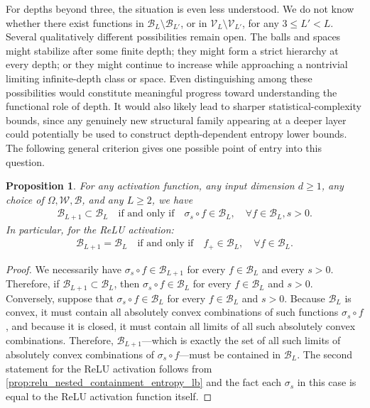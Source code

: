 \documentclass{article}
\def\cB{{\mathcal{B}}}
\def\cV{{\mathcal{V}}}
\def\cW{{\mathcal{W}}}
\newtheorem{proposition}[theorem]{Proposition}
\begin{document}
For depths beyond three, the situation is even less understood. We do not know whether there exist functions in $\cB_L\setminus \cB_{L'}$, or in $\cV_L\setminus \cV_{L'}$, for any $3\leq L'<L$. Several qualitatively different possibilities remain open. The balls and spaces might stabilize after some finite depth; they might form a strict hierarchy at every depth; or they might continue to increase while approaching a nontrivial limiting infinite-depth class or space. Even distinguishing among these possibilities would constitute meaningful progress toward understanding the functional role of depth. It would also likely lead to sharper statistical-complexity bounds, since any genuinely new structural family appearing at a deeper layer could potentially be used to construct depth-dependent entropy lower bounds. The following general criterion gives one possible point of entry into this question.

\begin{proposition}
\label{prop:depth-stabilization}
For any activation function, any input dimension $d \geq 1$, any choice of $\Omega, \cW, \cB$, and any $L\geq 2$, we have
\begin{align}
    \cB_{L+1} \subset \cB_L \quad \textrm{if and only if} \quad \sigma_s \circ f \in \cB_L, \quad \forall f \in \cB_L, s > 0.
\end{align}
In particular, for the ReLU activation:
\begin{align}
    \cB_{L+1} = \cB_L \quad \textrm{if and only if} \quad f_+ \in \cB_L, \quad \forall f \in \cB_L.
\end{align}
\end{proposition}
\begin{proof}
    We necessarily have $\sigma_s \circ f \in \cB_{L+1}$ for every $f \in \cB_L$ and every $s > 0$. Therefore, if $\cB_{L+1} \subset \cB_L$, then $\sigma_s \circ f \in \cB_L$ for every $f \in \cB_L$ and $s > 0$. Conversely, suppose that $\sigma_s \circ f \in \cB_L$ for every $f \in \cB_L$ and $s > 0$. Because $\cB_L$ is convex, it must contain all absolutely convex combinations of such functions $\sigma_s \circ f$, and because it is closed, it must contain all limits of all such absolutely convex combinations. Therefore, $\cB_{L+1}$---which is exactly the set of all such limits of absolutely convex combinations of $\sigma_s \circ f$---must be contained in $\cB_L$. The second statement for the ReLU activation follows from \cref{prop:relu_nested_containment_entropy_lb} and the fact each $\sigma_s$ in this case is equal to the ReLU activation function itself.
\end{proof}
\end{document}
